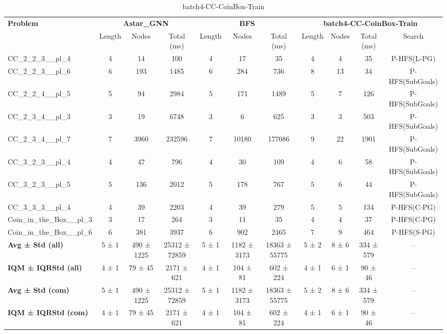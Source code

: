 \begin{table}[!ht]
\centering
\scriptsize
\begin{tabular}{l|ccc|ccc|cccc}
\multirow{2}{*}{\textbf{Problem}} & \multicolumn{3}{c|}{\textbf{Astar\_GNN}} & \multicolumn{3}{c|}{\textbf{BFS}} & \multicolumn{4}{c}{\textbf{batch4-CC-CoinBox-Train}} \\
\cline{2-11}
& Length & Nodes & Total (ms) & Length & Nodes & Total (ms) & Length & Nodes & Total (ms) & Search \\
\hline
CC\_2\_2\_3\_\_pl\_4 & 4 & 14 & 100 & 4 & 17 & 35 & 4 & 4 & 35 & P-HFS(L-PG) \\
CC\_2\_2\_3\_\_pl\_6 & 6 & 193 & 1485 & 6 & 284 & 736 & 8 & 13 & 34 & P-HFS(SubGoals) \\
CC\_2\_2\_4\_\_pl\_5 & 5 & 94 & 2984 & 5 & 171 & 1489 & 5 & 7 & 126 & P-HFS(SubGoals) \\
CC\_2\_3\_4\_\_pl\_3 & 3 & 19 & 6748 & 3 & 6 & 625 & 3 & 3 & 503 & P-HFS(SubGoals) \\
CC\_2\_3\_4\_\_pl\_7 & 7 & 3960 & 232596 & 7 & 10180 & 177086 & 9 & 22 & 1901 & P-HFS(SubGoals) \\
CC\_3\_2\_3\_\_pl\_4 & 4 & 47 & 796 & 4 & 30 & 109 & 4 & 6 & 58 & P-HFS(SubGoals) \\
CC\_3\_2\_3\_\_pl\_5 & 5 & 136 & 2012 & 5 & 178 & 767 & 5 & 6 & 44 & P-HFS(SubGoals) \\
CC\_3\_3\_3\_\_pl\_4 & 4 & 39 & 2203 & 4 & 39 & 279 & 5 & 5 & 134 & P-HFS(C-PG) \\
Coin\_in\_the\_Box\_\_pl\_3 & 3 & 17 & 264 & 3 & 11 & 35 & 4 & 4 & 37 & P-HFS(C-PG) \\
Coin\_in\_the\_Box\_\_pl\_6 & 6 & 381 & 3937 & 6 & 902 & 2465 & 7 & 9 & 464 & P-HFS(S-PG) \\
\hline
\textbf{Avg ± Std (all)} & 5 ± 1 & 490 ± 1225 & 25312 ± 72859 & 5 ± 1 & 1182 ± 3173 & 18363 ± 55775 & 5 ± 2 & 8 ± 6 & 334 ± 579 & -- \\
\textbf{IQM ± IQRStd (all)} & 4 ± 1 & 79 ± 45 & 2171 ± 621 & 4 ± 1 & 104 ± 81 & 602 ± 224 & 4 ± 1 & 6 ± 1 & 90 ± 46 & -- \\
\textbf{Avg ± Std (com)} & 5 ± 1 & 490 ± 1225 & 25312 ± 72859 & 5 ± 1 & 1182 ± 3173 & 18363 ± 55775 & 5 ± 2 & 8 ± 6 & 334 ± 579 & -- \\
\textbf{IQM ± IQRStd (com)} & 4 ± 1 & 79 ± 45 & 2171 ± 621 & 4 ± 1 & 104 ± 81 & 602 ± 224 & 4 ± 1 & 6 ± 1 & 90 ± 46 & -- \\
\end{tabular}
\caption{batch4-CC-CoinBox-Train}
\label{tab:batch4_CC-CoinBox_comparison_train}
\end{table}
